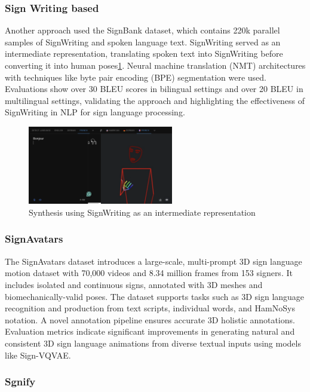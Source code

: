 \subsubsection{Sign Writing based}

Another approach\cite{TODO} used the SignBank dataset, which contains 220k parallel samples of SignWriting and spoken language text. SignWriting served as an intermediate representation, translating spoken text into SignWriting before converting it into human poses\ref{fig:sw_synthesis}. Neural machine translation (NMT) architectures with techniques like byte pair encoding (BPE) segmentation were used. Evaluations show over 30 BLEU scores in bilingual settings and over 20 BLEU in multilingual settings, validating the approach and highlighting the effectiveness of SignWriting in NLP for sign language processing.

\begin{figure}
  \centering \includegraphics[width = 2.5in]{images/background_work/sign_writing_synthesis.png}
  \caption{Synthesis using SignWriting as an intermediate representation}
  \label{fig:sw_synthesis}
\end{figure}

\subsubsection{SignAvatars}

The SignAvatars dataset introduces a large-scale, multi-prompt 3D sign language motion dataset with 70,000 videos and 8.34 million frames from 153 signers. It includes isolated and continuous signs, annotated with 3D meshes and biomechanically-valid poses. The dataset supports tasks such as 3D sign language recognition and production from text scripts, individual words, and HamNoSys notation. A novel annotation pipeline ensures accurate 3D holistic annotations. Evaluation metrics indicate significant improvements in generating natural and consistent 3D sign language animations from diverse textual inputs using models like Sign-VQVAE.

\subsubsection{Sgnify}

